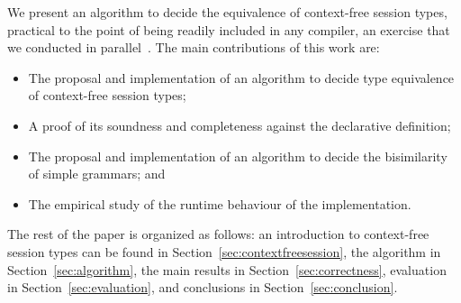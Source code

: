 

We present an algorithm to decide the equivalence of context-free
session types,  practical to the point of being readily included
in any compiler, an exercise that we conducted in
parallel~\cite{almeida.etal_freest-functional-language}.
%
The main contributions of this work are:
%
\begin{itemize}
\item The proposal and implementation of an algorithm to decide type
  equivalence of context-free session types;
\item A proof of its soundness and completeness against the
  declarative definition;
\item The proposal and implementation of an algorithm to decide
  the bisimilarity of simple grammars; and
\item The empirical study of the runtime behaviour of the
  implementation.
\end{itemize}


The rest of the paper is organized as follows: an introduction to
context-free session types can be found in
Section~\ref{sec:contextfreesession}, the algorithm in
Section~\ref{sec:algorithm}, the main results in
Section~\ref{sec:correctness},
evaluation in Section~\ref{sec:evaluation}, and conclusions in
Section~\ref{sec:conclusion}.


